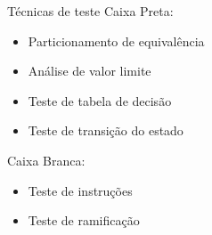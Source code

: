 
\begin{frame}{Técnicas de teste}
    Caixa Preta:
    \begin{itemize}
        \item Particionamento de equivalência
        \item Análise de valor limite
        \item Teste de tabela de decisão
        \item Teste de transição do estado
    \end{itemize}

    Caixa Branca:
    \begin{itemize}
        \item Teste de instruções
        \item Teste de ramificação
    \end{itemize}
\end{frame}